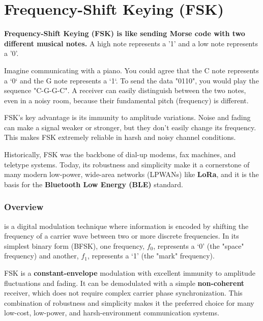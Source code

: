 
\chapter{Frequency-Shift Keying (FSK)}
\label{ch:fsk}

\begin{nontechnical}
    \textbf{Frequency-Shift Keying (FSK) is like sending Morse code with two different musical notes.} A high note represents a '1' and a low note represents a '0'.

     Imagine communicating with a piano. You could agree that the C note represents a `0` and the G note represents a `1`. To send the data "0110", you would play the sequence "C-G-G-C". A receiver can easily distinguish between the two notes, even in a noisy room, because their fundamental pitch (frequency) is different.

     FSK's key advantage is its immunity to amplitude variations. Noise and fading can make a signal weaker or stronger, but they don't easily change its frequency. This makes FSK extremely reliable in harsh and noisy channel conditions.

     Historically, FSK was the backbone of dial-up modems, fax machines, and teletype systems. Today, its robustness and simplicity make it a cornerstone of many modern low-power, wide-area networks (LPWANs) like \textbf{LoRa}, and it is the basis for the \textbf{Bluetooth Low Energy (BLE)} standard.
\end{nontechnical}


\subsection{Overview}

 is a digital modulation technique where information is encoded by shifting the frequency of a carrier wave between two or more discrete frequencies. In its simplest binary form (BFSK), one frequency, $f_0$, represents a `0' (the "space" frequency) and another, $f_1$, represents a `1' (the "mark" frequency).

\begin{keyconcept}
    FSK is a \textbf{constant-envelope} modulation with excellent immunity to amplitude fluctuations and fading. It can be demodulated with a simple \textbf{non-coherent} receiver, which does not require complex carrier phase synchronization. This combination of robustness and simplicity makes it the preferred choice for many low-cost, low-power, and harsh-environment communication systems.
\end{keyconcept}


